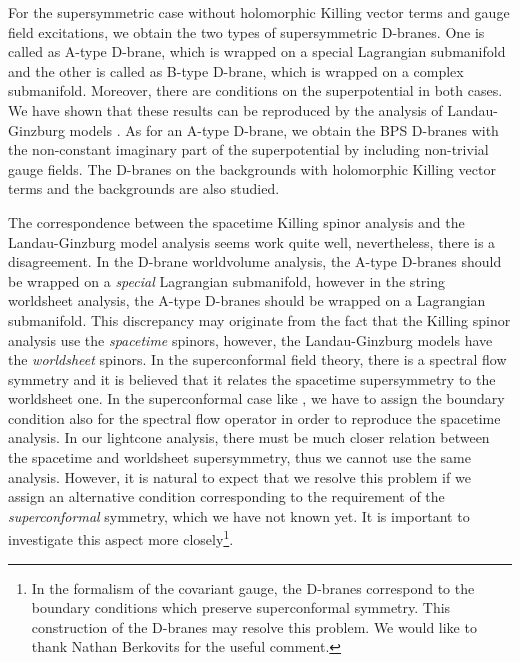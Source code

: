 \documentclass[a4paper,12pt]{article}
\numberwithin{equation}{section}
\begin{document}
For the \coordHE{} supersymmetric case without holomorphic Killing
vector terms and gauge field excitations, 
we obtain the two types of supersymmetric
D-branes. One is called as A-type D-brane, which is wrapped on a
special Lagrangian submanifold and the other is called as B-type
D-brane, which is wrapped on a complex submanifold.
Moreover, there are conditions on the superpotential in both cases.
We have shown that these results can be reproduced by
the analysis of Landau-Ginzburg models \cite{Hori:2000ck}.
As for an A-type D-brane, we obtain the BPS D-branes with the non-constant
imaginary part of the superpotential by including non-trivial gauge fields.
The D-branes on the backgrounds with holomorphic Killing vector terms
and the \coordHE{} backgrounds are also studied.

The correspondence between the spacetime Killing spinor
analysis and the Landau-Ginzburg model analysis seems work quite well,
nevertheless, there is a disagreement.
In the D-brane worldvolume analysis, the A-type D-branes should
be wrapped on a {\it special } Lagrangian submanifold, however in the
string worldsheet analysis, the A-type D-branes should be 
wrapped on a Lagrangian submanifold.
This discrepancy may originate from the fact that the Killing spinor
analysis use the {\it spacetime} spinors, however, the Landau-Ginzburg models
have the {\it worldsheet} spinors.
In the \coordHE{} superconformal field theory, there is a spectral flow
symmetry and it is believed that it relates 
the spacetime supersymmetry to the worldsheet one.
In the superconformal case like \cite{Ooguri:1996ck,Becker:1996ay},
we have to assign the boundary condition also for the spectral flow operator
in order to reproduce the spacetime analysis.
In our lightcone analysis, there must be much closer relation between
the spacetime and worldsheet supersymmetry, thus we cannot use the same
analysis.
However, it is natural to expect that we resolve this problem 
if we assign an alternative condition corresponding to
the requirement of the {\it superconformal} symmetry, which we have not
known yet.
It is important to investigate this aspect more closely\footnote{
In the \coordHE{} formalism \cite{Berkovits:2002vn} of the covariant
gauge, the D-branes correspond to the boundary conditions which preserve
superconformal symmetry. 
This construction of the D-branes may resolve this problem.
We would like to thank Nathan Berkovits for the useful comment.}.
\end{document}
